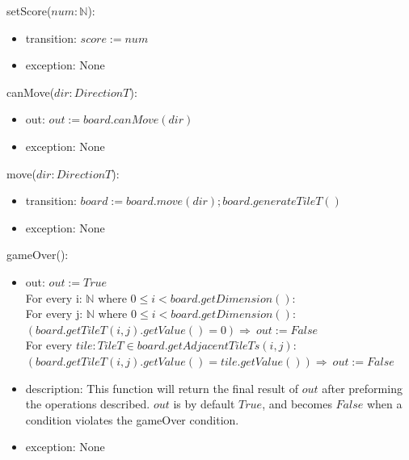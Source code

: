 \documentclass[12pt]{article}
\begin{document}
\noindent setScore($num: \mathbb{N}$):
\begin{itemize}
  \item transition: $score := num$
  \item exception: None
\end{itemize}

\noindent canMove($dir: DirectionT$):
\begin{itemize}
  \item out: $out := board.canMove(dir)$
  \item exception: None
\end{itemize}

\noindent move($dir: DirectionT$):
\begin{itemize}
  \item transition: $board := board.move(dir); board.generateTileT()$
  \item exception: None
\end{itemize}

\noindent gameOver():
\begin{itemize}
  \item out: $out := True$\hfill\\
        \noindent For every i: $\mathbb{N}$ where $0 \le i < board.getDimension()$: \\
        \noindent\hspace*{0.5cm} For every j: $\mathbb{N}$ where $0 \le i < board.getDimension()$: \\
        \noindent\hspace*{1cm} $(board.getTileT(i,j).getValue() = 0) \Rightarrow\ out:= False$ \\
        \noindent\hspace*{1cm} For every $tile: TileT \in board.getAdjacentTileTs(i, j)$: \\
        \noindent\hspace*{1.5cm} $(board.getTileT(i, j).getValue() = tile.getValue()) \Rightarrow\ out:= False$
  \item description: This function will return the final result of $out$ after preforming the operations described. $out$ is by default $True$, and becomes $False$ when a condition violates the gameOver condition.
  \item exception: None
\end{itemize}
\end{document}

